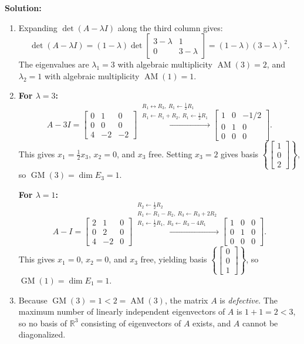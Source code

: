 \documentclass[11pt, letterpaper]{article}
\theoremstyle{definition}
\theoremstyle{remark}
\begin{document}
\textbf{Solution:}
\begin{enumerate}[label=(\alph*)]
    \item Expanding $\det(A - \lambda I)$ along the third column gives:
    \[
    \det(A - \lambda I) = (1 - \lambda)\det \begin{bmatrix} 3 - \lambda & 1 \\ 0 & 3 - \lambda \end{bmatrix} = (1 - \lambda)(3 - \lambda)^2.
    \]
    The eigenvalues are $\lambda_1 = 3$ with algebraic multiplicity $\operatorname{AM}(3) = 2$, and $\lambda_2 = 1$ with algebraic multiplicity $\operatorname{AM}(1) = 1$.

    \item \textbf{For $\lambda = 3$:}
    \[
    A - 3I = \begin{bmatrix} 0 & 1 & 0 \\ 0 & 0 & 0 \\ 4 & -2 & -2 \end{bmatrix}
    \xrightarrow{\substack{R_1 \leftrightarrow R_3,\ R_1 \leftarrow \frac{1}{2}R_1 \\ R_1 \leftarrow R_1 + R_2,\ R_1 \leftarrow \frac{1}{2}R_1}}
    \begin{bmatrix} 1 & 0 & -1/2 \\ 0 & 1 & 0 \\ 0 & 0 & 0 \end{bmatrix}.
    \]
    This gives $x_1 = \frac{1}{2}x_3$, $x_2 = 0$, and $x_3$ free. Setting $x_3 = 2$ gives basis $\left\{ \begin{bmatrix} 1 \\ 0 \\ 2 \end{bmatrix} \right\}$, so $\operatorname{GM}(3) = \dim E_3 = 1$.

    \textbf{For $\lambda = 1$:}
    \[
    A - I = \begin{bmatrix} 2 & 1 & 0 \\ 0 & 2 & 0 \\ 4 & -2 & 0 \end{bmatrix}
    \xrightarrow{\substack{R_2 \leftarrow \frac{1}{2}R_2 \\ R_1 \leftarrow R_1 - R_2,\ R_3 \leftarrow R_3 + 2R_2 \\ R_1 \leftarrow \frac{1}{2}R_1,\ R_3 \leftarrow R_3 - 4R_1}}
    \begin{bmatrix} 1 & 0 & 0 \\ 0 & 1 & 0 \\ 0 & 0 & 0 \end{bmatrix}.
    \]
    This gives $x_1 = 0$, $x_2 = 0$, and $x_3$ free, yielding basis $\left\{ \begin{bmatrix} 0 \\ 0 \\ 1 \end{bmatrix} \right\}$, so $\operatorname{GM}(1) = \dim E_1 = 1$.

    \item Because $\operatorname{GM}(3) = 1 < 2 = \operatorname{AM}(3)$, the matrix $A$ is \emph{defective}. The maximum number of linearly independent eigenvectors of $A$ is $1 + 1 = 2 < 3$, so no basis of $\mathbb{R}^3$ consisting of eigenvectors of $A$ exists, and $A$ cannot be diagonalized.
\end{enumerate}
\end{document}
